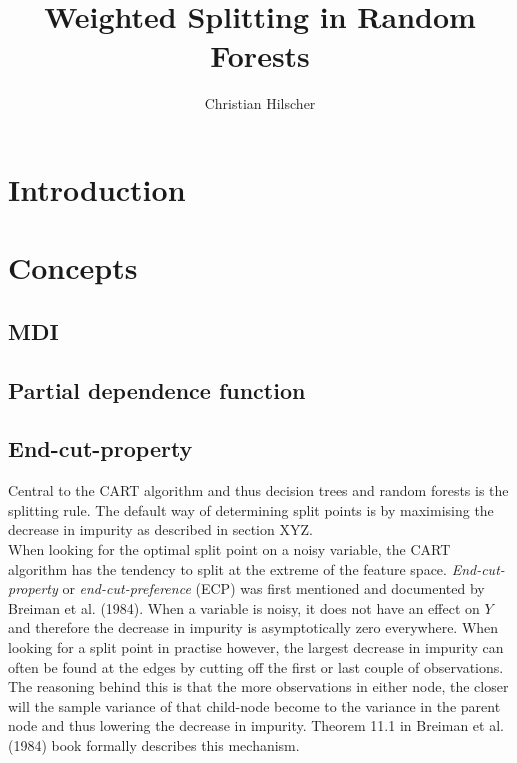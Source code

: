 \documentclass{article}
\title{Weighted Splitting in Random Forests}
\author{Christian Hilscher}
\begin{document}
\maketitle

\section{Introduction}





\section{Concepts}

\subsection{MDI}

\subsection{Partial dependence function}

\subsection{End-cut-property}

Central to the CART algorithm and thus decision trees and random forests is the splitting rule. The default way of determining split points is by maximising the decrease in impurity as described in section XYZ. \\
When looking for the optimal split point on a noisy variable, the CART algorithm has the tendency to split at the extreme of the feature space. \textit{End-cut-property} or \textit{end-cut-preference} (ECP) was first mentioned and documented by Breiman et al. (1984). When a variable is noisy, it does not have an effect on $Y$ and therefore the decrease in impurity is asymptotically zero everywhere. When looking for a split point in practise however, the largest decrease in impurity can often be found at the edges by cutting off the first or last couple of observations. The reasoning behind this is that the more observations in either node, the closer will the sample variance of that child-node become to the variance in the parent node and thus lowering the decrease in impurity. Theorem 11.1 in Breiman et al. (1984) book formally describes this mechanism. \\
\end{document}

